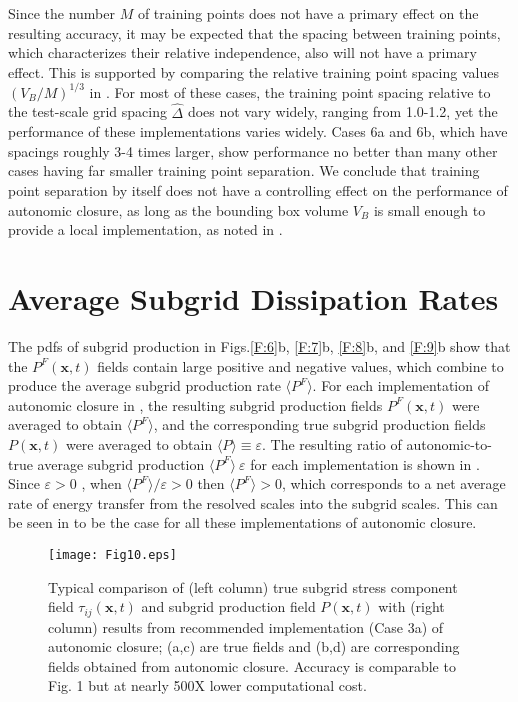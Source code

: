 Since the number $M$ of training points does not have a primary effect on the resulting accuracy, it may be expected that the spacing between training points, which characterizes their relative independence, also will not have a primary effect. This is supported by comparing the relative training point spacing values $(V_B/M)^{1/3}$ in . For most of these cases, the training point spacing relative to the test-scale grid spacing $\widehat{\Delta}$  does not vary widely, ranging from 1.0-1.2, yet the performance of these implementations varies widely. Cases 6a and 6b, which have spacings roughly 3-4 times larger, show performance no better than many other cases having far smaller training point separation. We conclude that training point separation by itself does not have a controlling effect on the performance of autonomic closure, as long as the bounding box volume  $V_B$ is small enough to provide a local implementation, as noted in .

\section{Average Subgrid Dissipation Rates}
\label{sec:IVF}

The pdfs of subgrid production in Figs.\ref{F:6}b, \ref{F:7}b, \ref{F:8}b, and \ref{F:9}b show that the $P^F(\mathbf{x},t)$  fields contain large positive and negative values, which combine to produce the average subgrid production rate $\langle P^F \rangle$. For each implementation of autonomic closure in , the resulting  subgrid production fields $P^F(\mathbf{x},t)$  were averaged to obtain $\langle P^F \rangle$, and the corresponding true subgrid production fields $P(\mathbf{x},t)$   were averaged to obtain $\langle P \rangle \equiv \varepsilon$. The resulting ratio of autonomic-to-true average subgrid production $\langle P^F \rangle\ \varepsilon$  for each implementation is shown in . Since $\varepsilon > 0$ , when  $\langle P^F\rangle/ \varepsilon > 0$  then $\langle P^F \rangle > 0$, which corresponds to a net average rate of energy transfer from the resolved scales into the subgrid scales.  This can be seen in  to be the case for all these implementations of autonomic closure. 

%
\begin{figure}
	\begin{center} \hspace{1.5cm}
	\texttt{[image: Fig10.eps]}
	\caption{Typical comparison of (left column) true subgrid stress component field $\tau_{ij}(\mathbf{x},t)$ and subgrid production field $P(\mathbf{x},t)$ with (right column) results from recommended implementation (Case 3a) of autonomic closure; (a,c) are true fields and (b,d) are corresponding fields obtained from autonomic closure. Accuracy is comparable to Fig. 1 but at nearly 500X lower computational cost.}
	\label{F:10}
	\end{center}
\end{figure}
%
%

